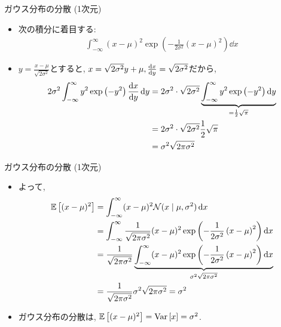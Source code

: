 \documentclass[dvipdfmx,notheorems,t]{beamer}
\begin{document}
\begin{frame}{ガウス分布の分散 (1次元)}
\begin{itemize}
  \item 次の積分に着目する:
  \begin{align*}
    \int_{-\infty}^\infty (x - \mu)^2
      \exp \left( -\frac{1}{2 \sigma^2} \left( x - \mu \right)^2 \right) \dd{x}
  \end{align*}
  \item $y = \frac{x - \mu}{\sqrt{2 \sigma^2}}$とすると,
  $x = \sqrt{2 \sigma^2} y + \mu, \dv{x}{y} = \sqrt{2 \sigma^2}$だから,
  \begin{align*}
    2 \sigma^2 \int_{-\infty}^\infty y^2 \exp \left( -y^2 \right) \dv{x}{y} \dd{y}
      &= 2 \sigma^2 \cdot \sqrt{2 \sigma^2}
        \underbrace{\int_{-\infty}^\infty y^2 \exp \left( -y^2 \right) \dd{y}}_{= \frac{1}{2} \sqrt{\pi}} \\
      &= 2 \sigma^2 \cdot \sqrt{2 \sigma^2} \frac{1}{2} \sqrt{\pi} \\
      &= \sigma^2 \sqrt{2 \pi \sigma^2}
  \end{align*}
\end{itemize}
\end{frame}

\begin{frame}{ガウス分布の分散 (1次元)}
\begin{itemize}
  \item よって,
  \begin{align*}
    \operatorname{\mathbb{E}} \left[ (x - \mu)^2 \right] &= \int_{-\infty}^\infty (x - \mu)^2 \mathcal{N}(x \mid \mu, \sigma^2) \dd{x} \\
      &= \int_{-\infty}^\infty \frac{1}{\sqrt{2 \pi \sigma^2}} (x - \mu)^2
        \exp \left( -\frac{1}{2 \sigma^2} \left( x - \mu \right)^2 \right) \dd{x} \\
      &= \frac{1}{\sqrt{2 \pi \sigma^2}} \underbrace{\int_{-\infty}^\infty (x - \mu)^2
        \exp \left( -\frac{1}{2 \sigma^2} \left( x - \mu \right)^2 \right) \dd{x}}_{\sigma^2 \sqrt{2 \pi \sigma^2}} \\
      &= \frac{1}{\sqrt{2 \pi \sigma^2}} \sigma^2 \sqrt{2 \pi \sigma^2} = \sigma^2
  \end{align*}
  \item ガウス分布の分散は, $\operatorname{\mathbb{E}} \left[ (x - \mu)^2 \right] = \operatorname{Var} \left[ x \right] = \sigma^2$.
\end{itemize}
\end{frame}
\end{document}
